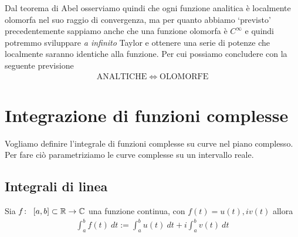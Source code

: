 \begin{remark}
	Dal teorema di Abel osserviamo quindi che ogni funzione analitica è localmente olomorfa nel suo raggio di convergenza, ma per quanto abbiamo `previsto' precedentemente sappiamo anche che una funzione olomorfa è $C^\infty$ e quindi potremmo sviluppare \textit{a infinito} Taylor e ottenere una serie di potenze che localmente saranno identiche alla funzione. Per cui possiamo concludere con la seguente previsione 
	\begin{equation*}
	\begin{aligned}
		\textrm{ANALTICHE} \Longleftrightarrow \mathrm{OLOMORFE}
	\end{aligned}
	\end{equation*}
\end{remark}


\chapter{Integrazione di funzioni complesse}
   	
Vogliamo definire l'integrale di funzioni complesse su curve nel piano complesso. Per fare ciò parametriziamo le curve complesse su un intervallo reale. 

\section{Integrali di linea}

\begin{definition}
	\label{defn:integrale-funzione-complessa-parametrizzata-su-intervallo-reale}
	Sia $f \colon\ \left[a,b\right]\subset \mathbb{R} \rightarrow \mathbb{C}$ una funzione continua, con $f(t) = u(t), iv(t)$ allora 
	\begin{equation*}
	\begin{aligned}
		\int_{a}^{b} f(t)\ dt := \int_{a}^{b} u(t)\ dt + i \int_{a}^{b} v(t)\ dt 
	\end{aligned}
	\end{equation*}
\end{definition}

